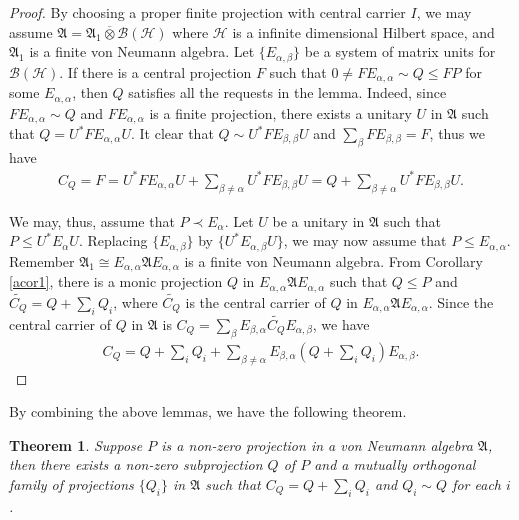 \documentclass{amsart}
\newcommand{\AAA}{\mathfrak A}
\newcommand{\B}{\mathcal B}
\newcommand{\HHH}{\mathcal H} %
\newtheorem{theorem}{Theorem}[section]
\begin{document}
\begin{proof}
By choosing a proper finite projection with central carrier $I$, we may assume $\AAA = \AAA_1 \overline{\otimes} \B(\HHH)$ where 
$\HHH$ is a infinite dimensional Hilbert space, and $\AAA_1$ is a finite von Neumann algebra. Let $\{ E_{\alpha, \beta} \}$ be a system of matrix units for $\B(\HHH)$.
If there is a central projection $F$ such that $0 \neq FE_{\alpha, \alpha} \sim Q \leq FP$ for some $E_{\alpha, \alpha}$,
then $Q$ satisfies all the requests in the lemma. Indeed, since $FE_{\alpha, \alpha} \sim Q$ and $FE_{\alpha, \alpha}$ is a finite projection,
there exists a unitary $U$ in $\AAA$ such that $Q = U^* FE_{\alpha, \alpha}U$. It clear that $Q \sim U^{*} FE_{\beta,\beta} U$ and $\sum_{\beta} FE_{\beta, \beta} = F$, 
thus we have 
\begin{align*}
C_Q = F = U^{*}FE_{\alpha,\alpha} U + \sum_{\beta \neq \alpha}U^{*} FE_{\beta,\beta} U = Q + \sum_{\beta \neq \alpha}U^{*} FE_{\beta,\beta} U.  
\end{align*}

We may, thus, assume that $P \prec E_\alpha$. Let $U$ be a unitary in $\AAA$ such that $P \leq U^* E_\alpha U$. 
Replacing $\{E_{\alpha, \beta} \}$ by  $\{U^* E_{\alpha, \beta}U \}$, we may now assume that  
$P \leq E_{\alpha, \alpha}$. Remember $\AAA_{1} \cong E_{\alpha, \alpha} \AAA E_{\alpha, \alpha}$ is a finite von Neumann algebra. From Corollary \ref{acor1}, there is 
a monic projection $Q$ in $E_{\alpha, \alpha} \AAA E_{\alpha, \alpha}$ such that $Q  \leq P$ and $\widetilde{C_{Q}} = Q + \sum_{i}Q_i$, where $\widetilde{C_{Q}}$ is the central carrier of 
$Q$ in $E_{\alpha, \alpha} \AAA E_{\alpha, \alpha}$. Since the central carrier of $Q$ in $\AAA$ is $C_{Q} = \sum_{\beta}E_{\beta, \alpha}\widetilde{C_{Q}}E_{\alpha, \beta}$, we have
\begin{align*}
C_{Q} = Q + \sum_{i}Q_i + \sum_{\beta \neq \alpha} E_{\beta, \alpha} (Q + \sum_{i}Q_i)E_{\alpha, \beta}.
\end{align*}
\end{proof}

By combining the above lemmas, we have the following theorem.

\begin{theorem}\label{athm1}
Suppose $P$ is a non-zero projection in a von Neumann algebra $ \AAA$, then 
there exists  a non-zero subprojection $Q$ of $P$ and a mutually orthogonal family of projections  $\{Q_i\}$ in $\AAA$ such that $C_{Q} = Q + \sum_{i}Q_i$ and $Q_i \sim Q$ for 
each $i$.   
\end{theorem}
\end{document}
